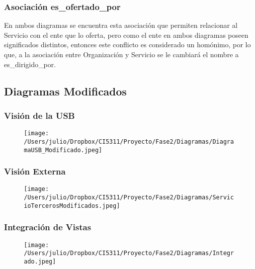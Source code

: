 \documentclass[12pt,a4paper,spanish]{article}
\begin{document}
\subsubsection{Asociaci\'on es\_ofertado\_por}
\indent En ambos diagramas se encuentra esta asociaci\'on que permiten relacionar al Servicio con el ente que lo oferta, pero como el ente en ambos diagramas poseen significados distintos, entonces este conflicto es considerado un hom\'onimo, por lo que, a la asociaci\'on entre Organizaci\'on y Servicio se le cambiar\'a el nombre a es\_dirigido\_por.

\subsection{Diagramas Modificados}
\subsubsection{Visi\'on de la USB}
\begin{landscape}
\begin{figure}
    \texttt{[image: /Users/julio/Dropbox/CI5311/Proyecto/Fase2/Diagramas/DiagramaUSB\_Modificado.jpeg]}
\end{figure} 
\end{landscape}
\newpage
\subsubsection{Visi\'on Externa}
\begin{landscape}
\begin{figure}
    \texttt{[image: /Users/julio/Dropbox/CI5311/Proyecto/Fase2/Diagramas/ServicioTercerosModificados.jpeg]}
\end{figure} 
\end{landscape}
\subsubsection{Integraci\'on de Vistas}
\begin{landscape}
\begin{figure}
    \texttt{[image: /Users/julio/Dropbox/CI5311/Proyecto/Fase2/Diagramas/Integrado.jpeg]}
\end{figure} 
\end{landscape}
\end{document}

